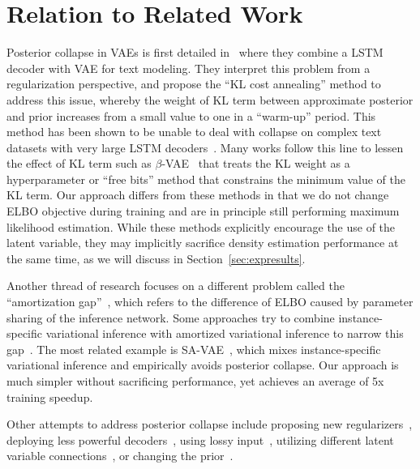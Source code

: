 \documentclass{article} \usepackage{iclr2019_conference,times}
\begin{document}
\section{Relation to Related Work}
Posterior collapse in VAEs is first detailed in~\citep{bowman2015generating} where they combine a LSTM decoder with VAE for text modeling. They interpret this problem from a regularization perspective, and propose the ``KL cost annealing'' method to address this issue, whereby the weight of KL term between approximate posterior and prior increases from a small value to one in a ``warm-up'' period. This method has been shown to be unable to deal with collapse on complex text datasets with very large LSTM decoders~\citep{yang2017improved,kim2018semi}. Many works follow this line to lessen the effect of KL term such as $\beta$-VAE~\citep{higgins2016beta} that treats the KL weight as a hyperparameter or ``free bits'' method that constrains the minimum value of the KL term. 
Our approach differs from these methods in that we do not change ELBO objective during training and are in principle still performing maximum likelihood estimation. While these methods explicitly encourage the use of the latent variable, they may implicitly sacrifice density estimation performance at the same time, as we will discuss in Section~\ref{sec:expresults}.

Another thread of research focuses on a different problem called the ``amortization gap''~\citep{cremer2018inference}, which refers to the difference of ELBO caused by parameter sharing of the inference network. Some approaches try to combine instance-specific variational inference with amortized variational inference to narrow this gap~\citep{hjelm2016iterative,krishnan2018challenges,kim2018semi,marino2018iterative}. The most related example is SA-VAE~\citep{kim2018semi}, which mixes instance-specific variational inference and empirically avoids posterior collapse. Our approach is much simpler without sacrificing performance, yet achieves an average of 5x training speedup. 

Other attempts to address posterior collapse include proposing new regularizers~\citep{zhao2017infovae,goyal2017z,tolstikhin2017wasserstein,phuong2018the}, deploying less powerful decoders~\citep{yang2017improved,semeniuta2017hybrid}, using lossy input~\citep{chen2016variational}, utilizing different latent variable connections~\citep{dieng2016topicrnn,dieng2018avoiding, park2018hierarchical}, or changing the prior~\citep{tomczak2017vae,xu2018spherical}. 
\end{document}

